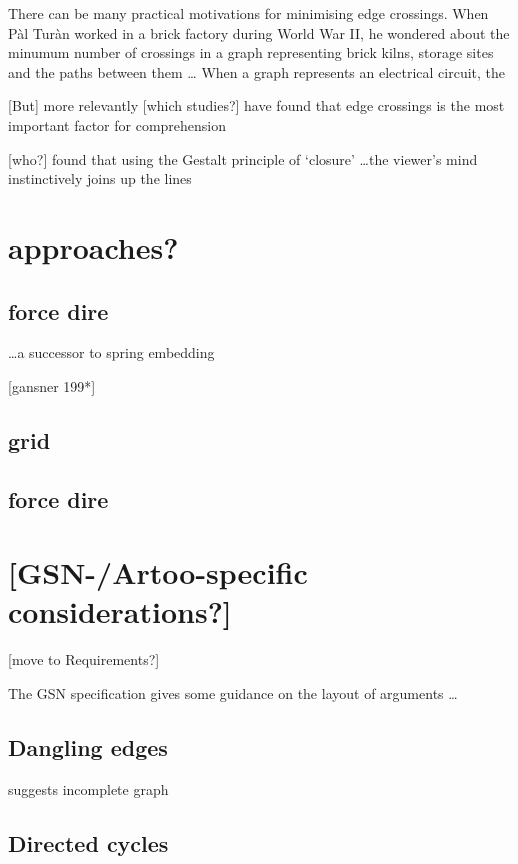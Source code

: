 \documentclass[authoryearcitations]{UoYCSproject}
\begin{document}
There can be many practical motivations for minimising edge crossings.
When P\`{a}l Tur\`{a}n worked in a brick factory during World War II,
he wondered about the minumum number of crossings in a graph representing
brick kilns, storage sites and the paths between them \ldots
When a graph represents an electrical circuit, the  

[But] more relevantly [which studies?] have found that edge crossings is the most important factor for comprehension

[who?] found that using the Gestalt principle of `closure' \ldots the viewer's mind instinctively joins up the lines

\section{approaches?}

\subsection{force dire}

\ldots a successor to \citet{tutte} spring embedding

[gansner 199*]

\subsection{grid}



\subsection{force dire}

\section{[GSN-/Artoo-specific considerations?]}

[move to Requirements?]

The GSN specification \citep[section~2.2, pp.~26--27]{gsnstandard} gives some guidance on the layout of arguments \ldots



\subsection{Dangling edges}

suggests incomplete graph

\subsection{Directed cycles}
\end{document}
